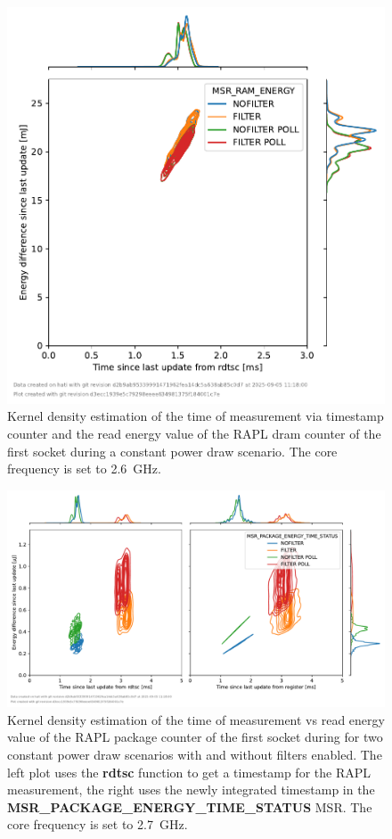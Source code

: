 \begin{figure}[]
    \centering
    \includegraphics[width=0.54\columnwidth]{fig/rapl-update-intervals/MSR_RAM_ENERGY_2600000.pdf}
    \caption{Kernel density estimation of the time of measurement via timestamp counter and the read energy value of the RAPL dram counter of the first socket during a constant power draw scenario.
    The core frequency is set to \SI{2.6}{\GHz}.}
\end{figure}

\clearpage
\begin{figure}[]
    \centering
    \includegraphics[width=\columnwidth]{fig/rapl-update-intervals/MSR_PACKAGE_ENERGY_TIME_STATUS_2700000.pdf}
    \caption{Kernel density estimation of the time of measurement vs read energy value of the RAPL package counter of the first socket during for two constant power draw scenarios with and without filters enabled.
    The left plot uses the \textbf{rdtsc} function to get a timestamp for the RAPL measurement, the right uses the newly integrated timestamp in the \textbf{MSR\_PACKAGE\_ENERGY\_TIME\_STATUS} MSR.
    The core frequency is set to \SI{2.7}{\GHz}.}
\end{figure}

